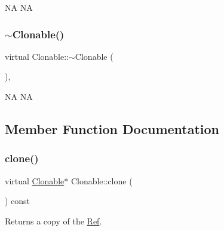 NA  NA \mbox{\label{classClonable_a2b9c911b4a49b532da3dea9951cf5fac}} 
\subsubsection{\texorpdfstring{$\sim$\+Clonable()}{~Clonable()}\hspace{0.1cm}{\footnotesize\ttfamily [2/2]}}
{\footnotesize\ttfamily virtual Clonable\+::$\sim$\+Clonable (\begin{DoxyParamCaption}{ }\end{DoxyParamCaption})\hspace{0.3cm}{\ttfamily [inline]}, {\ttfamily [virtual]}}

NA  NA 

\subsection{Member Function Documentation}
\mbox{\label{classClonable_a36b05a0fa605f4f269e5884bde7f9e0c}} 
\subsubsection{\texorpdfstring{clone()}{clone()}\hspace{0.1cm}{\footnotesize\ttfamily [1/2]}}
{\footnotesize\ttfamily virtual \hyperlink{classClonable}{Clonable}$\ast$ Clonable\+::clone (\begin{DoxyParamCaption}{ }\end{DoxyParamCaption}) const\hspace{0.3cm}{\ttfamily [pure virtual]}}

Returns a copy of the \hyperlink{classRef}{Ref}. 

